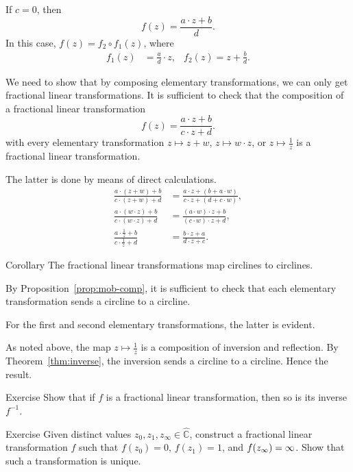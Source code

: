 If $c=0$, then
\[f(z) = \frac{a\cdot z + b}{ d}.\]
In this case, $f(z)=f_2\circ f_1 (z)$,
where 
\begin{align*}
f_1(z)&= \tfrac ad\cdot z,
&
f_2(z)= z+\tfrac bd.
\end{align*}

We need to show that by composing elementary transformations,
we can only get fractional linear transformations.
It is sufficient to check that the composition of a fractional linear transformation
$$f(z) = \frac{a\cdot z + b}{c\cdot z + d}.$$
with every elementary transformation $z\mapsto z+w$, $z\mapsto w\cdot z$, or $z\mapsto \tfrac1z$ is a fractional linear transformation.

The latter is done by means of direct calculations.
\begin{align*}
\frac{a\cdot (z+w) + b}{c\cdot (z+w) + d}
&=
\frac{a\cdot z + (b+a\cdot w)}{c\cdot z + (d+c\cdot w)},
\\
\frac{a\cdot (w\cdot z) + b}{c\cdot (w\cdot z) + d}
&=
\frac{(a\cdot w)\cdot z + b}{(c\cdot w)\cdot z + d},
\\
\frac{a\cdot \frac1z + b}{c\cdot \frac1z + d}
&=
\frac{b\cdot z + a}{d\cdot z + c}.
\end{align*}
\qedsf


\begin{thm}{Corollary}\label{cor:cline-Moeb}
The fractional linear transformations map circlines to circlines.
\end{thm}

By Proposition~\ref{prop:mob-comp},
it is sufficient to check that each elementary transformation sends a circline to a circline.

For the first and second elementary transformations, the latter is evident.

As noted above,
the map $z\mapsto\tfrac1z$ is a composition of inversion and reflection.
By Theorem~\ref{thm:inverse}, the inversion sends a circline to a circline.
Hence the result.
\qeds

\begin{thm}{Exercise}\label{ex:inverse-Mob}
Show that if $f$ is a fractional linear transformation, then so is its inverse $f^{-1}$.
\end{thm}


\begin{thm}{Exercise}\label{ex:3-point-Mob}
Given distinct values $z_0,z_1,z_\infty\in \hat{\mathbb{C}}$,
construct a fractional linear transformation $f$ such that 
$f(z_0)=0$,
$f(z_1)=1$,
and 
$f(z_\infty)\z=\infty$.
Show that such a transformation is unique.
\end{thm}

